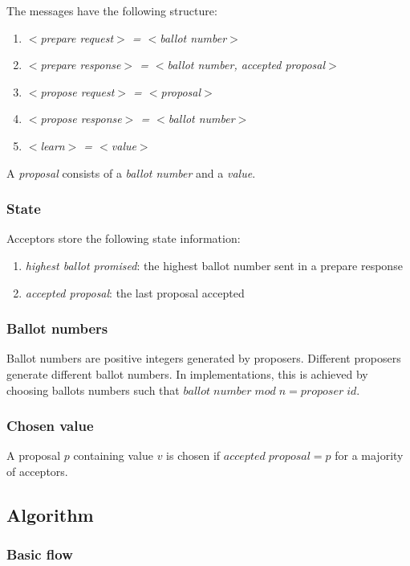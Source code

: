 \documentclass[12pt]{article}
\begin{document}
The messages have the following structure:
\begin{enumerate}
\item \emph{$<$prepare request$>$ = $<$ballot number$>$}
\item \emph{$<$prepare response$>$ = $<$ballot number, accepted proposal$>$}
\item \emph{$<$propose request$>$ = $<$proposal$>$}
\item \emph{$<$propose response$>$ = $<$ballot number$>$}
\item \emph{$<$learn$>$ = $<$value$>$}
\end{enumerate}

A \emph{proposal} consists of a \emph{ballot number} and a \emph{value}.

\subsubsection{ State }
Acceptors store the following state information:
\begin{enumerate}
\item \emph{highest ballot promised}: the highest ballot number sent in a prepare response
\item \emph{accepted proposal}: the last proposal accepted
\end{enumerate}

\subsubsection{ Ballot numbers }
Ballot numbers are positive integers generated by proposers. Different proposers generate different ballot numbers. In implementations, this is achieved by choosing ballots numbers such that
$ballot \; number \; mod \; n = proposer \; id$.

\subsubsection{ Chosen value }
A proposal $p$ containing value $v$ is chosen if $ accepted \; proposal = p $ for a majority of acceptors.

\subsection{ Algorithm }

\subsubsection{ Basic flow }
\end{document}
